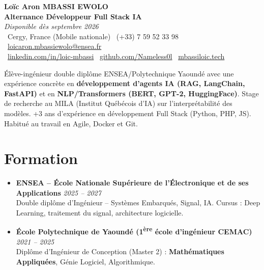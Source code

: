\documentclass[a4paper,11pt]{article}
\begin{document}
\begin{center}
    {\Large \textbf{Loïc Aron MBASSI EWOLO}} \\ \vspace{4pt}
    \textbf{\large Alternance Développeur Full Stack IA} \\
    \textit{\small Disponible dès septembre 2026} \\ \vspace{4pt}
    \small
    \faMapMarker\ Cergy, France (Mobile nationale) \quad
    \faPhone\ (+33) 7 59 52 33 98 \quad
    \faEnvelope\ \href{mailto:loicaron.mbassiewolo@ensea.fr}{loicaron.mbassiewolo@ensea.fr} \\ \vspace{2pt}
    \faLinkedin\ \href{https://www.linkedin.com/in/loic-mbassi/}{linkedin.com/in/loic-mbassi} \quad
    \faGithub\ \href{https://github.com/Nameless0l}{github.com/Nameless0l} \quad
    \faGlobe\ \href{https://mbassiloic.tech}{mbassiloic.tech}
\end{center}

\vspace{-6pt}

\noindent\small{Élève-ingénieur double diplôme ENSEA/Polytechnique Yaoundé avec une expérience concrète en \textbf{développement d'agents IA (RAG, LangChain, FastAPI)} et en \textbf{NLP/Transformers (BERT, GPT-2, HuggingFace)}. Stage de recherche au MILA (Institut Québécois d'IA) sur l'interprétabilité des modèles. +3 ans d'expérience en développement Full Stack (Python, PHP, JS). Habitué au travail en Agile, Docker et Git.}

\section{Formation}
\begin{itemize}[leftmargin=*, label=\tiny$\bullet$, nosep]
    \item \textbf{ENSEA -- École Nationale Supérieure de l'Électronique et de ses Applications} \hfill \textit{2025 -- 2027} \\
    \small{Double diplôme d'Ingénieur -- Systèmes Embarqués, Signal, IA. Cursus : Deep Learning, traitement du signal, architecture logicielle.}
    \item \textbf{École Polytechnique de Yaoundé (1\textsuperscript{ère} école d'ingénieur CEMAC)} \hfill \textit{2021 -- 2025} \\
    \small{Diplôme d'Ingénieur de Conception (Master 2) : \textbf{Mathématiques Appliquées}, Génie Logiciel, Algorithmique.}
\end{itemize}
\end{document}
